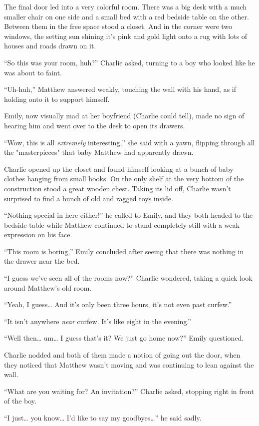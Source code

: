 The final door led into a very colorful room. There was a big desk with a much smaller chair on one side and a small bed with a red bedside table on the other. Between them in the free space stood a closet. And in the corner were two windows, the setting sun shining it's pink and gold light onto a rug with lots of houses and roads drawn on it.

“So this was your room, huh?” Charlie asked, turning to a boy who looked like he was about to faint.

“Uh-huh,” Matthew answered weakly, touching the wall with his hand, as if holding onto it to support himself.

Emily, now visually mad at her boyfriend (Charlie could tell), made no sign of hearing him and went over to the desk to open its drawers.

“Wow, this is all \textit{extremely} interesting,” she said with a yawn, flipping through all the "masterpieces" that baby Matthew had apparently drawn.

Charlie opened up the closet and found himself looking at a bunch of baby clothes hanging from small hooks. On the only shelf at the very bottom of the construction stood a great wooden chest. Taking its lid off, Charlie wasn't surprised to find a bunch of old and ragged toys inside.

“Nothing special in here either!” he called to Emily, and they both headed to the bedside table while Matthew continued to stand completely still with a weak expression on his face.

“This room is boring,” Emily concluded after seeing that there was nothing in the drawer near the bed.

“I guess we've seen all of the rooms now?” Charlie wondered, taking a quick look around Matthew's old room.

“Yeah, I guess… And it's only been three hours, it's not even past curfew.”

“It isn't anywhere \textit{near} curfew. It's like eight in the evening.”

“Well then… um… I guess that's it? We just go home now?” Emily questioned.

Charlie nodded and both of them made a notion of going out the door, when they noticed that Matthew wasn't moving and was continuing to lean against the wall.

“What are you waiting for? An invitation?” Charlie asked, stopping right in front of the boy.

“I just… you know… I'd like to say my goodbyes…” he said sadly.


